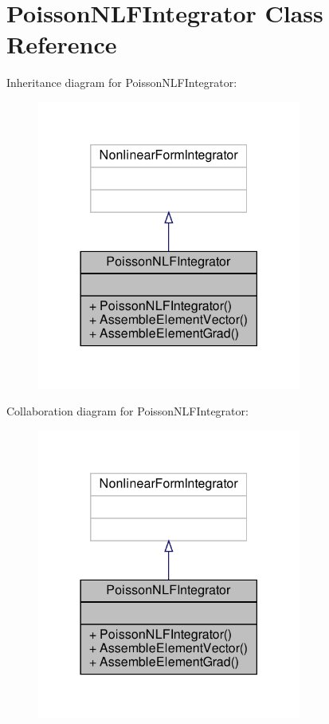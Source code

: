 \hypertarget{classPoissonNLFIntegrator}{}\section{Poisson\+N\+L\+F\+Integrator Class Reference}
\label{classPoissonNLFIntegrator}


Inheritance diagram for Poisson\+N\+L\+F\+Integrator\+:\nopagebreak
\begin{figure}[H]
\begin{center}
\leavevmode
\includegraphics[width=246pt]{classPoissonNLFIntegrator__inherit__graph}
\end{center}
\end{figure}


Collaboration diagram for Poisson\+N\+L\+F\+Integrator\+:\nopagebreak
\begin{figure}[H]
\begin{center}
\leavevmode
\includegraphics[width=246pt]{classPoissonNLFIntegrator__coll__graph}
\end{center}
\end{figure}

